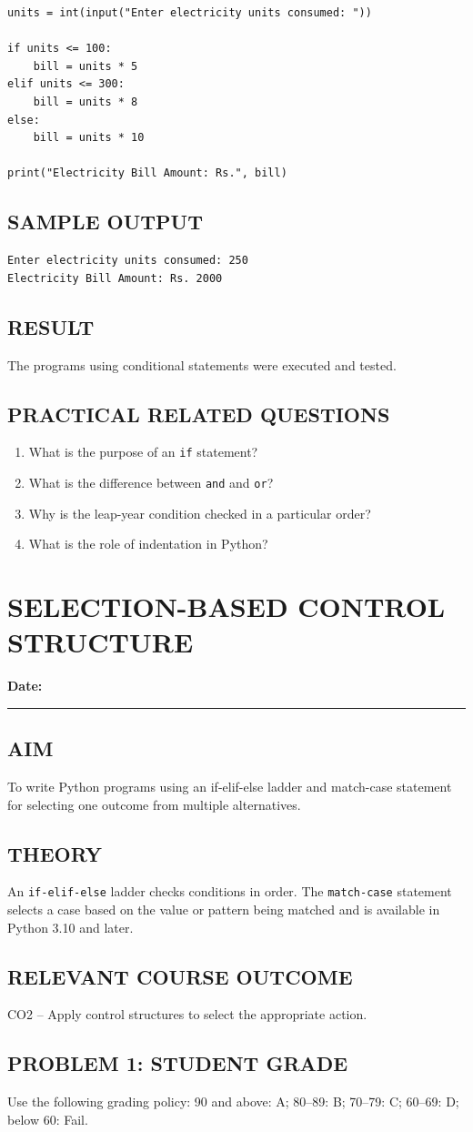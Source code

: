 \documentclass[12pt,a4paper]{report}
\newcommand{\experimentdate}{\hfill\textbf{Date:} \rule{3cm}{0.4pt}}
\newcommand{\aim}[1]{\section*{AIM}#1}
\newcommand{\result}[1]{\section*{RESULT}#1}
\newcommand{\courseoutcome}[1]{\section*{RELEVANT COURSE OUTCOME}#1}
\newcommand{\questions}[1]{\section*{PRACTICAL RELATED QUESTIONS}#1}
\newcommand{\sampleoutput}{\section*{SAMPLE OUTPUT}}
\begin{document}
\begin{lstlisting}
units = int(input("Enter electricity units consumed: "))

if units <= 100:
    bill = units * 5
elif units <= 300:
    bill = units * 8
else:
    bill = units * 10

print("Electricity Bill Amount: Rs.", bill)
\end{lstlisting}

\sampleoutput
\begin{verbatim}
Enter electricity units consumed: 250
Electricity Bill Amount: Rs. 2000
\end{verbatim}

\result{The programs using conditional statements were executed and tested.}

\questions{
\begin{enumerate}
\item What is the purpose of an \texttt{if} statement?
\item What is the difference between \texttt{and} and \texttt{or}?
\item Why is the leap-year condition checked in a particular order?
\item What is the role of indentation in Python?
\end{enumerate}}

\chapter{SELECTION-BASED CONTROL STRUCTURE}
\experimentdate

\aim{To write Python programs using an if-elif-else ladder and match-case statement for selecting one outcome from multiple alternatives.}

\section*{THEORY}
An \texttt{if-elif-else} ladder checks conditions in order. The \texttt{match-case}
statement selects a case based on the value or pattern being matched and is available
in Python 3.10 and later.

\courseoutcome{CO2 -- Apply control structures to select the appropriate action.}

\section*{PROBLEM 1: STUDENT GRADE}
Use the following grading policy: 90 and above: A; 80--89: B; 70--79: C; 60--69: D; below 60: Fail.
\end{document}

